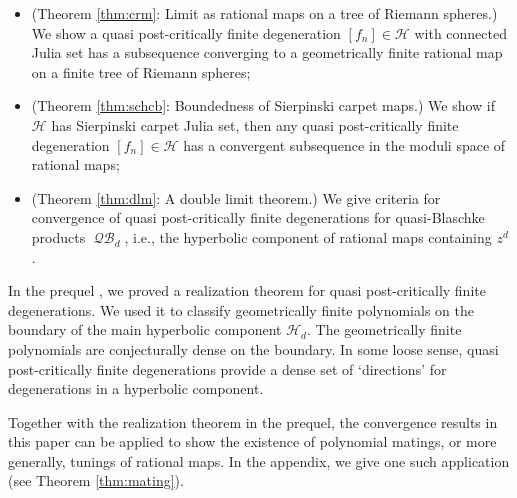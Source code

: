 \documentclass[11pt, reqno]{amsart}
\numberwithin{equation}{section}
\theoremstyle{plain}
\theoremstyle{theorem}
\theoremstyle{definition}
\DeclareMathOperator{\QH}{\mathcal{QB}}
\numberwithin{figure}{section}
\begin{document}
\begin{itemize}
\item (Theorem \ref{thm:crm}: Limit as rational maps on a tree of Riemann spheres.) We show a quasi post-critically finite degeneration $[f_n] \in \mathcal{H}$ with connected Julia set has a subsequence converging to a geometrically finite rational map on a finite tree of Riemann spheres; 
\item (Theorem \ref{thm:schcb}: Boundedness of Sierpinski carpet maps.) We show if $\mathcal{H}$ has Sierpinski carpet Julia set, then any quasi post-critically finite degeneration $[f_n] \in \mathcal{H}$ has a convergent subsequence in the moduli space of rational maps;
\item (Theorem \ref{thm:dlm}: A double limit theorem.) We give criteria for convergence of quasi post-critically finite degenerations for quasi-Blaschke products $\QH_d$, i.e., the hyperbolic component of rational maps containing $z^d$.
\end{itemize}

In the prequel \cite{Luo21}, we proved a realization theorem for quasi post-critically finite degenerations.
We used it to classify geometrically finite polynomials on the boundary of the main hyperbolic component $\mathcal{H}_d$. 
The geometrically finite polynomials are conjecturally dense on the boundary.
In some loose sense, quasi post-critically finite degenerations provide a dense set of `directions' for degenerations in a hyperbolic component.

Together with the realization theorem in the prequel, the convergence results in this paper can be applied to show the existence of polynomial matings, or more generally, tunings of rational maps.
In the appendix, we give one such application (see Theorem \ref{thm:mating}).
\end{document}
